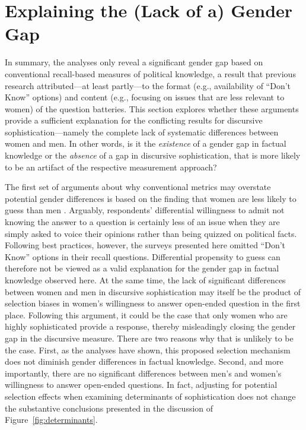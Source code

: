 

\section*{Explaining the (Lack of a) Gender Gap}

In summary, the analyses only reveal a significant gender gap based on conventional recall-based measures of political knowledge, a result that previous research attributed---at least partly---to the format (e.g., availability of ``Don't Know'' options) and content (e.g., focusing on issues that are less relevant to women) of the question batteries. This section explores whether these arguments provide a sufficient explanation for the conflicting results for discursive sophistication---namely the complete lack of systematic differences between women and men. In other words, is it the \textit{existence} of a gender gap in factual knowledge or the \textit{absence} of a gap in discursive sophistication, that is more likely to be an artifact of the respective measurement approach?

The first set of arguments about why conventional metrics may overstate potential gender differences is based on the finding that women are less likely to guess than men \citep{mondak2004knowledge}. Arguably, respondents' differential willingness to admit not knowing the answer to a question is certainly less of an issue when they are simply asked to voice their opinions rather than being quizzed on political facts. Following best practices, however, the surveys presented here omitted ``Don't Know'' options in their recall questions. Differential propensity to guess can therefore not be viewed as a valid explanation for the gender gap in factual knowledge observed here. At the same time, the lack of significant differences between women and men in discursive sophistication may itself be the product of selection biases in women's willingness to answer open-ended question in the first place. Following this argument, it could be the case that only women who are highly sophisticated provide a response, thereby misleadingly closing the gender gap in the discursive measure. There are two reasons why that is unlikely to be the case. First, as the analyses have shown, this proposed selection mechanism does not diminish gender differences in factual knowledge. Second, and more importantly, there are no significant differences between men's and women's willingness to answer open-ended questions. In fact, adjusting for potential selection effects when examining determinants of sophistication does not change the substantive conclusions presented in the discussion of Figure~\ref{fig:determinants}.

